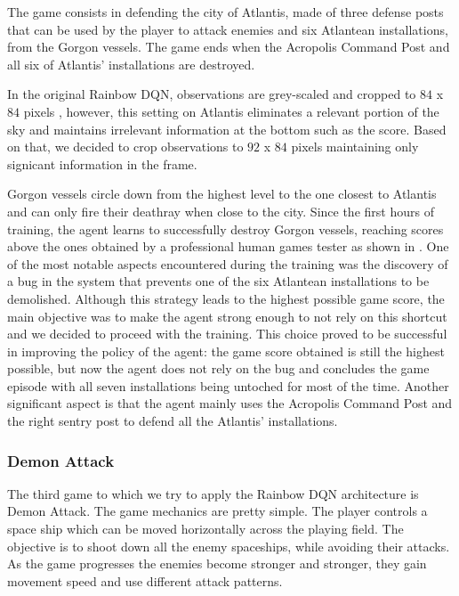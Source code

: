 \documentclass[10pt,twocolumn,letterpaper]{article}
\begin{document}
The game consists in defending the city of Atlantis, made of three defense posts that can be used by the player to attack enemies and six Atlantean installations, from the Gorgon vessels. The game ends when the Acropolis Command Post and all six of Atlantis' installations are destroyed. 

In the original Rainbow DQN, observations are grey-scaled and cropped to $84$ x $84$ pixels \cite{DBLP:journals/corr/abs-1710-02298}, however, this setting on Atlantis eliminates a relevant portion of the sky and maintains irrelevant information at the bottom such as the score. Based on that, we decided to crop observations to $92$ x $84$ pixels maintaining only signicant information in the frame.

Gorgon vessels circle down from the highest level to the one closest to Atlantis and can only fire their deathray when close to the city. Since the first hours of training, the agent learns to successfully destroy Gorgon vessels, reaching scores above the ones obtained by a professional human games tester as shown in \cite{humancontrol}.  One of the most notable aspects encountered during the training was the discovery of a bug in the system that prevents one of the six Atlantean installations to be demolished. Although this strategy leads to the highest possible game score, the main objective was to make the agent strong enough to not rely on this shortcut and we decided to proceed with the training. This choice proved to be successful in improving the policy of the agent: the game score obtained is still the highest possible, but now the agent does not rely on the bug and concludes the game episode with all seven installations being untoched for most of the time. Another significant aspect is that the agent mainly uses the Acropolis Command Post and the right sentry post to defend all the Atlantis' installations.

\subsubsection{Demon Attack}
\label{demon_attack}
The third game to which we try to apply the Rainbow DQN architecture is Demon Attack. The game mechanics are pretty simple. The player controls a space ship which can be moved horizontally across the playing field. The objective is to shoot down all the enemy spaceships, while avoiding their attacks. As the game progresses the enemies become stronger and stronger, they gain movement speed and use different attack patterns.
\end{document}
